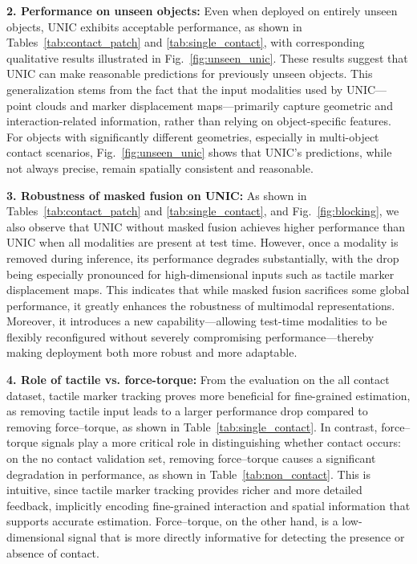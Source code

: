 \documentclass[letterpaper, 10 pt, conference]{ieeeconf}  %
\newcommand{\unic}{\textsc{UNIC}}
\begin{document}
\textbf{2. Performance on unseen objects:} Even when deployed on entirely unseen objects, \unic{} exhibits acceptable performance, as shown in Tables~\ref{tab:contact_patch} and \ref{tab:single_contact}, with corresponding qualitative results illustrated in Fig.~\ref{fig:unseen_unic}. These results suggest that \unic{} can make reasonable predictions for previously unseen objects. This generalization stems from the fact that the input modalities used by \unic{}—point clouds and marker displacement maps—primarily capture geometric and interaction-related information, rather than relying on object-specific features. For objects with significantly different geometries, especially in multi-object contact scenarios, Fig.~\ref{fig:unseen_unic} shows that \unic{}’s predictions, while not always precise, remain spatially consistent and reasonable.

\textbf{3. Robustness of masked fusion on \unic{}:} As shown in Tables~\ref{tab:contact_patch} and \ref{tab:single_contact}, and Fig.~\ref{fig:blocking}, we also observe that \unic{} without masked fusion achieves higher performance than \unic{} when all modalities are present at test time. However, once a modality is removed during inference, its performance degrades substantially, with the drop being especially pronounced for high-dimensional inputs such as tactile marker displacement maps. This indicates that while masked fusion sacrifices some global performance, it greatly enhances the robustness of multimodal representations. Moreover, it introduces a new capability—allowing test-time modalities to be flexibly reconfigured without severely compromising performance—thereby making deployment both more robust and more adaptable.

\textbf{4. Role of tactile vs. force-torque:} From the evaluation on the all contact dataset, tactile marker tracking proves more beneficial for fine-grained estimation, as removing tactile input leads to a larger performance drop compared to removing force–torque, as shown in Table~\ref{tab:single_contact}. In contrast, force–torque signals play a more critical role in distinguishing whether contact occurs: on the no contact validation set, removing force–torque causes a significant degradation in performance, as shown in Table~\ref{tab:non_contact}. This is intuitive, since tactile marker tracking provides richer and more detailed feedback, implicitly encoding fine-grained interaction and spatial information that supports accurate estimation. Force–torque, on the other hand, is a low-dimensional signal that is more directly informative for detecting the presence or absence of contact.
\end{document}
